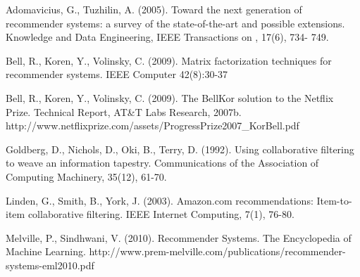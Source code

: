 \documentclass[letterpaper, 10 pt, conference]{ieeeconf}
\begin{document}
\begin{thebibliography}{99}

Adomavicius, G., Tuzhilin, A. (2005). Toward the next generation of recommender systems: a survey of the state-of-the-art and possible extensions. Knowledge and Data Engineering, IEEE Transactions on , 17(6),  734- 749.

Bell, R., Koren, Y., Volinsky, C. (2009). Matrix factorization techniques for recommender systems. IEEE Computer 42(8):30-37

Bell, R., Koren, Y., Volinsky, C. (2009). 
The BellKor solution to the Netﬂix Prize. Technical Report, AT\&T Labs 
Research, 2007b. 
http://www.netflixprize.com/assets/ProgressPrize2007\_KorBell.pdf


Goldberg, D., Nichols, D., Oki, B., Terry, D. (1992). 
Using collaborative filtering to weave an information tapestry. 
Communications of the Association of Computing Machinery, 35(12), 61-70.

Linden, G., Smith, B., York, J. (2003). Amazon.com recommendations: Item-to-item collaborative filtering. IEEE Internet
Computing, 7(1), 76-80.

Melville, P., Sindhwani, V. (2010).
Recommender Systems. The Encyclopedia of Machine Learning. 
http://www.prem-melville.com/publications/recommender-systems-eml2010.pdf

\end{thebibliography}
\end{document}
